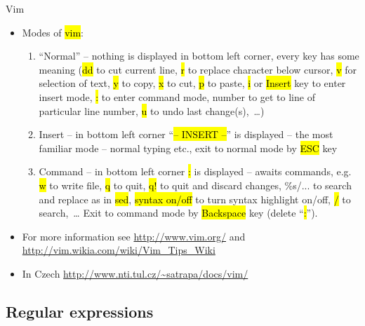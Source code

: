 \documentclass[compress, ucs, xelatex, 11pt, xcolor=svgnames,
  hyperref={
    bookmarks=true,
    unicode=true,
    colorlinks=true,
    pdftitle={Linux, command line and MetaCentrum},
    plainpages=false,
    pdfauthor={Vojtech Zeisek},
    pdfsubject={Course about use of Linux command line, writing shell scripts and using MetaCentrum of CESNET},
    pdfcreator={XeLaTeX},
    pdfkeywords={Linux, GNU, BASH, shell, command line, MetaCentrum},
    linkcolor=Red,
    anchorcolor=Blue,
    citecolor=Purple,
    filecolor=DodgerBlue,
    menucolor=DarkOrchid,
    urlcolor=DeepSkyBlue,
    pdftex},
  url={hyphens, lowtilde} %
  ]{beamer}
\renewcommand{\texttt}[1]{\hl{\ttfamily #1}}
\begin{document}
\begin{frame}{Vim}
\begin{itemize}
 \item Modes of \texttt{vim}:
  \begin{enumerate}
   \item ``Normal'' -- nothing is displayed in bottom left corner, every key has some meaning (\texttt{dd} to cut current line, \texttt{r} to replace character below cursor, \texttt{v} for selection of text, \texttt{y} to copy, \texttt{x} to cut, \texttt{p} to paste, \texttt{i} or \texttt{Insert} key to enter insert mode, \texttt{:} to enter command mode, number to get to line of particular line number, \texttt{u} to undo last change(s),~\ldots)
   \item Insert -- in bottom left corner ``\texttt{-- INSERT --}'' is displayed -- the most familiar mode -- normal typing etc., exit to normal mode by \texttt{ESC} key
   \item Command -- in bottom left corner \texttt{:} is displayed -- awaits commands, e.g. \texttt{w} to write file, \texttt{q} to quit, \texttt{q!} to quit and discard changes, \%s/... to search and replace as in \texttt{sed}, \texttt{syntax on/off} to turn syntax highlight on/off, \texttt{/} to search,~\ldots{ }Exit to command mode by \texttt{Backspace} key (delete ``\texttt{:}'').
  \end{enumerate}
  \item For more information see \url{http://www.vim.org/} and \url{http://vim.wikia.com/wiki/Vim_Tips_Wiki}
  \item In Czech \url{http://www.nti.tul.cz/~satrapa/docs/vim/}
\end{itemize}
\end{frame}

\subsection{Regular expressions}
\end{document}
